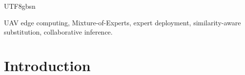 \documentclass[journal]{IEEEtran}
\begin{document}
\begin{CJK*}{UTF8}{gbsn}
\begin{IEEEkeywords}
UAV edge computing, Mixture-of-Experts, expert deployment,
similarity-aware substitution, collaborative inference.
\end{IEEEkeywords}

\IEEEpeerreviewmaketitle

\section{Introduction}
\label{sec:intro}






\end{CJK*}
\end{document}
